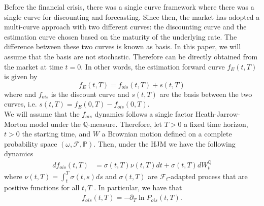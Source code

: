 \documentclass[a4paper,10pt]{article}
\newcommand{\1}{\mathbf{1}}
\begin{document}
Before the financial crisis, there was a single curve framework where there was a single curve for discounting and forecasting. Since then, the market has adopted a multi-curve approach with two different curves: the discounting curve and the estimation curve chosen based on the maturity of the underlying rate. The difference between these two curves is known as basis. In this paper, we will assume that the basis are not stochastic. Therefore can be directly obtained from the market at time $t=0$. In other words, the estimation forward curve $f_{E}(t, T)$ is given by
\begin{equation}\label{estimation_forward_rate_curve}
f_{E}(t,T) = f_{ois}(t,T) + s(t,T)
\end{equation}
where and $f_{ois}$ is the discount curve and $s(t,T)$ are the basis between the two curves, i.e. $s(t,T)= f_{E}(0,T) - f_{ois}(0,T)$.\\

We will assume that the $f_{ois}$ dynamics follows a single factor Heath-Jarrow-Morton model under the $\mathbb{Q}$-measure. Therefore, let $T>0$ a fixed time horizon, $t>0$ the starting time, and $W$ a Brownian motion defined on a complete probability space $(\omega, \mathcal{F}, \mathbb{P})$. Then, under the HJM we have the following dynamics
\begin{align}\label{ois_forward_rate_curve}
df_{ois}(t,T) &= \sigma(t,T)\nu(t,T)dt + \sigma(t,T)dW^{\mathbb{Q}}_t
\end{align}
where $\nu(t,T)=\int_{t}^{T}\sigma(t,s)ds$ and $\sigma(t, T)$ are $\mathcal{F}_{t}$-adapted process that are positive functions for all $t,T$ . In particular, we have that
\begin{eqnarray*}
f_{ois}(t,T)= -\partial_{T}\ln P_{ois}(t,T).
\end{eqnarray*}
\end{document}
